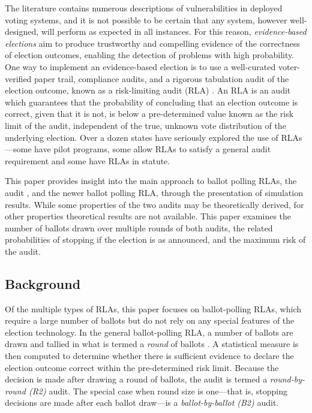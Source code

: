 The literature contains numerous descriptions of vulnerabilities in deployed voting systems, and it is not possible to be certain that any system, however well-designed, will perform as expected in all instances. For this reason, 
{\em evidence-based elections} \cite{evidence-based} aim to produce trustworthy and compelling evidence of the correctness of election outcomes, enabling the detection of problems with high probability. One way to implement an evidence-based election is to use a well-curated voter-verified paper trail, compliance audits, and a rigorous tabulation audit of the election outcome, known as a risk-limiting audit (RLA) \cite{RLA}. An RLA is an audit which guarantees that the probability of concluding that an election outcome is correct, given that it is not, is below a pre-determined value known as the risk limit of the audit, independent of the true, unknown vote distribution of the underlying election. Over a dozen states have seriously explored the use of RLAs---some have pilot programs, some allow RLAs to satisfy a general audit requirement and some have RLAs in statute.     

This paper provides insight into the main approach to ballot polling RLAs, the \BRAVO audit \cite{bravo}, and the newer \Minerva \cite{usenix_minerva} ballot polling RLA, through the presentation of simulation results. While some properties of the two audits may be theoretically derived, for other properties theoretical results are not available. This paper examines the number of ballots drawn over multiple rounds of both audits, the related probabilities of stopping if the election is as announced, and the maximum risk of the audit. 

\subsection{Background}
Of the multiple types of RLAs, this paper focuses on ballot-polling RLAs, which require a large number of ballots but do not rely on any special features of the election technology. In the general ballot-polling RLA, a number of ballots are drawn and tallied in what is termed a {\em round} of ballots \cite{usenix_minerva}. A statistical measure is then computed to determine whether there is sufficient evidence to declare the election outcome correct within the pre-determined risk limit. Because the decision is made after drawing a round of ballots, the audit is termed a {\em round-by-round (R2)} audit. The special case when round size is one---that is, stopping decisions are made after each ballot draw---is a {\em ballot-by-ballot (B2)} audit. 

